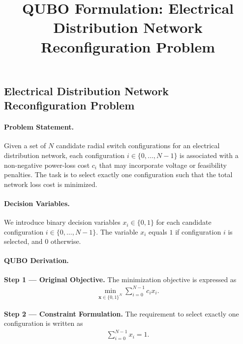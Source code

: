 \documentclass[12pt]{article}
\title{QUBO Formulation: Electrical Distribution Network Reconfiguration Problem}
\date{}
\begin{document}
\maketitle

\subsection*{Electrical Distribution Network Reconfiguration Problem}

\paragraph{Problem Statement.}
Given a set of $N$ candidate radial switch configurations for an electrical distribution network, each configuration $i \in \{0, \dots, N-1\}$ is associated with a non-negative power-loss cost $c_i$ that may incorporate voltage or feasibility penalties. The task is to select exactly one configuration such that the total network loss cost is minimized.

\paragraph{Decision Variables.}
We introduce binary decision variables $x_i \in \{0,1\}$ for each candidate configuration $i \in \{0, \dots, N-1\}$. The variable $x_i$ equals $1$ if configuration $i$ is selected, and $0$ otherwise.

\paragraph{QUBO Derivation.}
\textbf{Step 1 --- Original Objective.} The minimization objective is expressed as
\begin{align}
    \min_{\mathbf{x} \in \{0,1\}^N} \sum_{i=0}^{N-1} c_i x_i.
\end{align}

\textbf{Step 2 --- Constraint Formulation.} The requirement to select exactly one configuration is written as
\begin{align}
    \sum_{i=0}^{N-1} x_i = 1.
\end{align}
\end{document}
